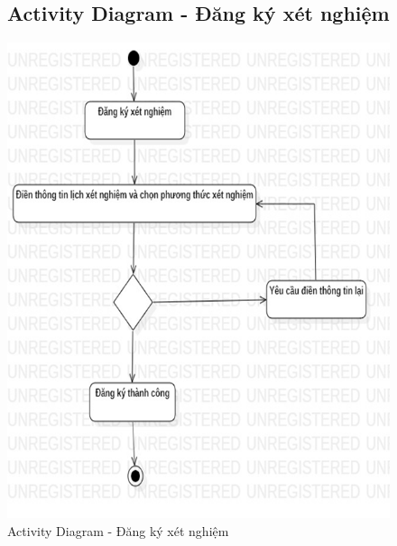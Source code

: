 \documentclass{report}
\begin{document}
\begin{center}
	\begin{figure}[!htp]
		\subsection{Activity Diagram - Đăng ký xét nghiệm}
		\begin{center}
			\includegraphics[scale=1]{Hinh/Activity diagram Đăng ký xét nghiệm.png}
		\end{center}
		\caption{Activity Diagram - Đăng ký xét nghiệm}
	\end{figure}
\end{center}
\end{document}
